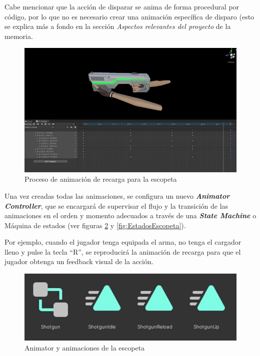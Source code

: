 \begin{enumerate}
    Cabe mencionar que la acción de disparar se anima de forma procedural por código, por lo que no es necesario crear una animación específica de disparo (esto se explica más a fondo en la sección \textit{Aspectos relevantes del proyecto} de la memoria.
    \begin{figure}[h]
    \centering
    \includegraphics[scale=0.45]{img/ReloadingShotgun.jpg}
    \caption{Proceso de animación de recarga para la escopeta}
    \label{fig:AnimacionEscopeta}
    \end{figure}
    Una vez creadas todas las animaciones, se configura un nuevo \textbf{\textit{Animator Controller}}, que se encargará de supervisar el flujo y la transición de las animaciones en el orden y momento adecuados a través de una \textbf{\textit{State Machine}} o Máquina de estados (ver figuras \ref{fig:AnimatorEscopeta} y \ref{fig:EstadosEscopeta}).
    
    Por ejemplo, cuando el jugador tenga equipada el arma, no tenga el cargador lleno y pulse la tecla ``R'', se reproducirá la animación de recarga para que el jugador obtenga un feedback visual de la acción.
    
    \begin{figure}[h]
    \centering
    \includegraphics[scale=0.45]{img/ShotgunAnimatorController.jpg}
    \caption{Animator y animaciones de la escopeta}
    \label{fig:AnimatorEscopeta}
    \end{figure}
    

\end{enumerate}
